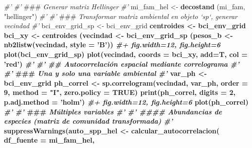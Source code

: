 \documentclass[11pt,]{article}
\newenvironment{Shaded}{\begin{snugshade}}{\end{snugshade}}
\newcommand{\KeywordTok}[1]{\textcolor[rgb]{0.13,0.29,0.53}{\textbf{#1}}}
\newcommand{\DataTypeTok}[1]{\textcolor[rgb]{0.13,0.29,0.53}{#1}}
\newcommand{\DecValTok}[1]{\textcolor[rgb]{0.00,0.00,0.81}{#1}}
\newcommand{\StringTok}[1]{\textcolor[rgb]{0.31,0.60,0.02}{#1}}
\newcommand{\CommentTok}[1]{\textcolor[rgb]{0.56,0.35,0.01}{\textit{#1}}}
\newcommand{\OtherTok}[1]{\textcolor[rgb]{0.56,0.35,0.01}{#1}}
\newcommand{\OperatorTok}[1]{\textcolor[rgb]{0.81,0.36,0.00}{\textbf{#1}}}
\newcommand{\AlertTok}[1]{\textcolor[rgb]{0.94,0.16,0.16}{#1}}
\newcommand{\NormalTok}[1]{#1}
\begin{document}
\begin{Shaded}
\begin{Highlighting}[]
{{\CommentTok{#' }
\CommentTok{#' }\AlertTok{###}\CommentTok{ Generar matriz Hellinger}
\CommentTok{#' }
\NormalTok{mi_fam_hel <-}\StringTok{ }\KeywordTok{decostand}\NormalTok{ (mi_fam, }\StringTok{"hellinger"}\NormalTok{)}
\CommentTok{#' }
\CommentTok{#' }\AlertTok{###}\CommentTok{ Transformar matriz ambiental en objeto `sp`, generar vecindad}
\CommentTok{#' }
\NormalTok{bci_env_grid_sp <-}\StringTok{ }\NormalTok{bci_env_grid }\OperatorTok{%
\NormalTok{centroides <-}\StringTok{ }\NormalTok{bci_env_grid }\OperatorTok{%
\NormalTok{bci_xy <-}\StringTok{ }\NormalTok{centroides }\OperatorTok{%
\NormalTok{(vecindad <-}\StringTok{ }\NormalTok{bci_env_grid_sp }\OperatorTok{%
\NormalTok{(pesos_b <-}\StringTok{ }\KeywordTok{nb2listw}\NormalTok{(vecindad, }\DataTypeTok{style =} \StringTok{'B'}\NormalTok{))}
\CommentTok{#+ fig.width=12, fig.height=6}
\KeywordTok{plot}\NormalTok{(bci_env_grid_sp)}
\KeywordTok{plot}\NormalTok{(vecindad, }\DataTypeTok{coords =}\NormalTok{ bci_xy, }\DataTypeTok{add=}\NormalTok{T, }\DataTypeTok{col =} \StringTok{'red'}\NormalTok{)}
\CommentTok{#' }
\CommentTok{#' ## Autocorrelación espacial mediante correlograma}
\CommentTok{#' }
\CommentTok{#' }\AlertTok{###}\CommentTok{ Una y solo una variable ambiental}
\CommentTok{#' }
\NormalTok{var_ph <-}\StringTok{ }\NormalTok{bci_env_grid }\OperatorTok{%
\NormalTok{ph_correl <-}\StringTok{ }\KeywordTok{sp.correlogram}\NormalTok{(vecindad,}
\NormalTok{                            var_ph,}
                            \DataTypeTok{order =} \DecValTok{9}\NormalTok{,}
                            \DataTypeTok{method =} \StringTok{"I"}\NormalTok{,}
                            \DataTypeTok{zero.policy =} \OtherTok{TRUE}\NormalTok{)}
\KeywordTok{print}\NormalTok{(ph_correl, }\DataTypeTok{digits =} \DecValTok{2}\NormalTok{, }\DataTypeTok{p.adj.method =} \StringTok{'holm'}\NormalTok{)}
\CommentTok{#+ fig.width=12, fig.height=6}
\KeywordTok{plot}\NormalTok{(ph_correl)}
\CommentTok{#'}
\CommentTok{#' }\AlertTok{###}\CommentTok{ Múltiples variables}
\CommentTok{#' }
\CommentTok{#' #### Abundancias de especies (matriz de comunidad transformada)}
\CommentTok{#' }
\KeywordTok{suppressWarnings}\NormalTok{(auto_spp_hel <-}\StringTok{ }\KeywordTok{calcular_autocorrelacion}\NormalTok{(}
  \DataTypeTok{df_fuente =}\NormalTok{ mi_fam_hel,}
}}}}}}}
\end{Highlighting}
\end{Shaded}
\end{document}
